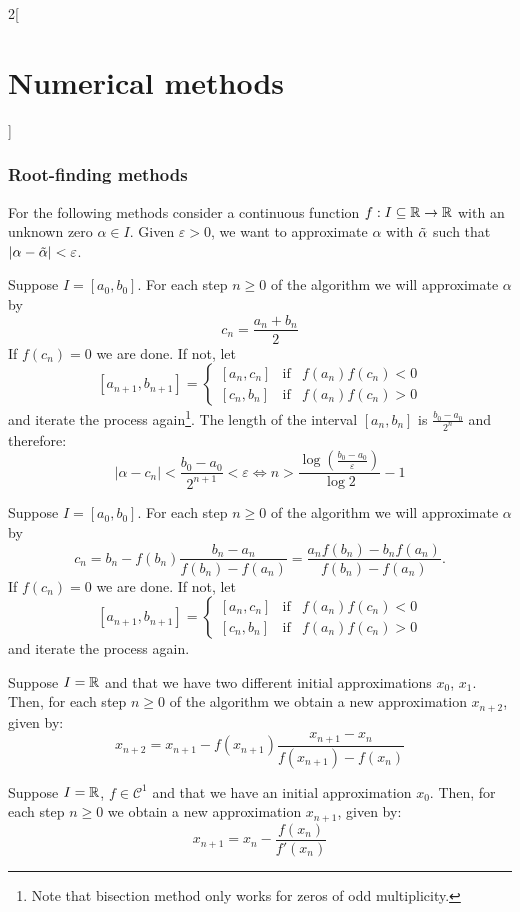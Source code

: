 \documentclass[../../../main.tex]{subfiles}
\begin{document}
\begin{multicols}{2}[\section{Numerical methods}]
\subsubsection*{Root-finding methods}
    For the following methods consider a continuous function $f:I\subseteq\mathbb{R}\rightarrow\mathbb{R}$ with an unknown zero $\alpha\in I$. Given $\varepsilon>0$, we want to approximate $\alpha$ with $\Tilde{\alpha}$ such that $|\alpha-\Tilde{\alpha}|<\varepsilon$.
\begin{method}
    Suppose $I=[a_0,b_0]$. For each step $n\geq 0$ of the algorithm we will approximate $\alpha$ by $$c_n=\frac{a_n+b_n}{2}$$ If $f(c_n)=0$ we are done. If not, let 
    $$[a_{n+1},b_{n+1}]=\left\{
    \begin{array}{ccc}
        [a_n,c_n] & \text{if} & f(a_n)f(c_n)<0 \\
        \left[c_n,b_n\right] & \text{if} & f(a_n)f(c_n)>0
    \end{array}\right.$$ 
    and iterate the process again\footnote{Note that bisection method only works for zeros of odd multiplicity.}. The length of the interval $[a_n,b_n]$ is $\frac{b_0-a_0}{2^n}$ and therefore: $$|\alpha-c_n|<\frac{b_0-a_0}{2^{n+1}}<\varepsilon\iff n>\frac{\log\left(\frac{b_0-a_0}{\varepsilon}\right)}{\log 2}-1$$
\end{method}
\begin{method}
    Suppose $I=[a_0,b_0]$. For each step $n\geq 0$ of the algorithm we will approximate $\alpha$ by $$c_n=b_n-f(b_n)\frac{b_n-a_n}{f(b_n)-f(a_n)}=\frac{a_nf(b_n)-b_nf(a_n)}{f(b_n)-f(a_n)}.$$ If $f(c_n)=0$ we are done. If not, let
    $$[a_{n+1},b_{n+1}]=\left\{
    \begin{array}{ccc}
        [a_n,c_n] & \text{if} & f(a_n)f(c_n)<0 \\
        \left[c_n,b_n\right] & \text{if} & f(a_n)f(c_n)>0
    \end{array}\right.$$ 
    and iterate the process again.
\end{method}
\begin{method}
    Suppose $I=\mathbb{R}$ and that we have two different initial approximations $x_0$, $x_1$. Then, for each step $n\geq 0$ of the algorithm we obtain a new approximation $x_{n+2}$, given by: $$x_{n+2}=x_{n+1}-f(x_{n+1})\frac{x_{n+1}-x_n}{f(x_{n+1})-f(x_n)}$$
\end{method}
\begin{method}
    Suppose $I=\mathbb{R}$, $f\in\mathcal{C}^1$ and that we have an initial approximation $x_0$. Then, for each step $n\geq 0$ we obtain a new approximation $x_{n+1}$, given by: $$x_{n+1}=x_n-\frac{f(x_n)}{f'(x_n)}$$

\end{method}
\end{multicols}
\end{document}
